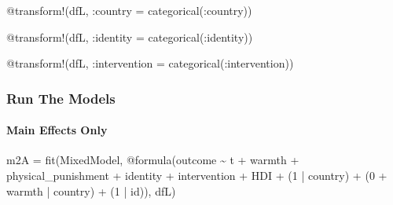 \documentclass[
  letterpaper,
  DIV=11,
  numbers=noendperiod]{scrreprt}
\let\oldparagraph\paragraph
\renewcommand{\paragraph}[1]{\oldparagraph{#1}\mbox{}}
\newenvironment{Shaded}{\begin{snugshade}}{\end{snugshade}}
\newcommand{\FloatTok}[1]{\textcolor[rgb]{0.68,0.00,0.00}{#1}}
\newcommand{\FunctionTok}[1]{\textcolor[rgb]{0.28,0.35,0.67}{#1}}
\newcommand{\NormalTok}[1]{\textcolor[rgb]{0.00,0.23,0.31}{#1}}
\newcommand{\OperatorTok}[1]{\textcolor[rgb]{0.37,0.37,0.37}{#1}}
\newcommand{\PreprocessorTok}[1]{\textcolor[rgb]{0.68,0.00,0.00}{#1}}
\begin{document}
\begin{Shaded}
\begin{Highlighting}[]
\PreprocessorTok{@transform}\NormalTok{!(dfL, }\OperatorTok{:}\NormalTok{country }\OperatorTok{=} \FunctionTok{categorical}\NormalTok{(}\OperatorTok{:}\NormalTok{country))}

\PreprocessorTok{@transform}\NormalTok{!(dfL, }\OperatorTok{:}\NormalTok{identity }\OperatorTok{=} \FunctionTok{categorical}\NormalTok{(}\OperatorTok{:}\NormalTok{identity))}

\PreprocessorTok{@transform}\NormalTok{!(dfL, }\OperatorTok{:}\NormalTok{intervention }\OperatorTok{=} \FunctionTok{categorical}\NormalTok{(}\OperatorTok{:}\NormalTok{intervention))}
\end{Highlighting}
\end{Shaded}

\subsubsection{Run The Models}\label{run-the-models-2}

\paragraph{Main Effects Only}\label{main-effects-only-2}

\begin{Shaded}
\begin{Highlighting}[]
\NormalTok{m2A }\OperatorTok{=} \FunctionTok{fit}\NormalTok{(MixedModel, }\PreprocessorTok{@formula}\NormalTok{(outcome }\OperatorTok{\textasciitilde{}}\NormalTok{ t }\OperatorTok{+}\NormalTok{ warmth }\OperatorTok{+} 
\NormalTok{                                 physical\_punishment }\OperatorTok{+} 
\NormalTok{                                 identity }\OperatorTok{+}\NormalTok{ intervention }\OperatorTok{+} 
\NormalTok{                                 HDI }\OperatorTok{+}
\NormalTok{                                 (}\FloatTok{1} \OperatorTok{|}\NormalTok{ country) }\OperatorTok{+} 
\NormalTok{                                 (}\FloatTok{0} \OperatorTok{+}\NormalTok{ warmth }\OperatorTok{|}\NormalTok{ country) }\OperatorTok{+}
\NormalTok{                                 (}\FloatTok{1} \OperatorTok{|}\NormalTok{ id)), dfL)}
\end{Highlighting}
\end{Shaded}
\end{document}
